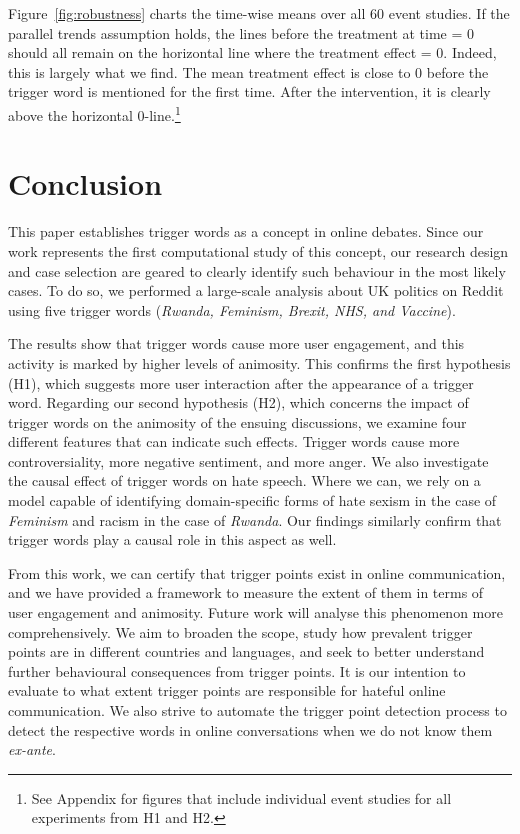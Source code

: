 Figure~\ref{fig:robustness} charts the time-wise means over all 60 event studies. If the parallel trends assumption holds, the lines before the treatment at time = 0 should all remain on the horizontal line where the treatment effect = 0. Indeed, this is largely what we find. The mean treatment effect is close to 0 before the trigger word is mentioned for the first time. After the intervention, it is clearly above the horizontal 0-line.\footnote{See Appendix for figures that include individual event studies for all experiments from H1 and H2.}



\section{Conclusion}
This paper establishes trigger words as a concept in online debates. Since our work represents the first computational study of this concept, our research design and case selection are geared to clearly identify such behaviour in the most likely cases. To do so, we performed a large-scale analysis about UK politics on Reddit using five trigger words (\textit{Rwanda, Feminism, Brexit, NHS, and Vaccine}). 

The results show that trigger words cause more user engagement, and this activity is marked by higher levels of animosity. This confirms the first hypothesis (H1), which suggests more user interaction after the appearance of a trigger word. Regarding our second hypothesis (H2), which concerns the impact of trigger words on the animosity of the ensuing discussions, we examine four different features that can indicate such effects. Trigger words cause more controversiality, more negative sentiment, and more anger. We also investigate the causal effect of trigger words on hate speech. Where we can, we rely on a model capable of identifying domain-specific forms of hate \textemdash sexism in the case of \textit{Feminism} and racism in the case of \textit{Rwanda}\textemdash. Our findings similarly confirm that trigger words play a causal role in this aspect as well.

From this work, we can certify that trigger points exist in online communication, and we have provided a framework to measure the extent of them in terms of user engagement and animosity. Future work will analyse this phenomenon more comprehensively. We aim to broaden the scope, study how prevalent trigger points are in different countries and languages, and seek to better understand further behavioural consequences from trigger points. It is our intention to evaluate to what extent trigger points are responsible for hateful online communication. We also strive to automate the trigger point detection process to detect the respective words in online conversations when we do not know them \emph{ex-ante}.

